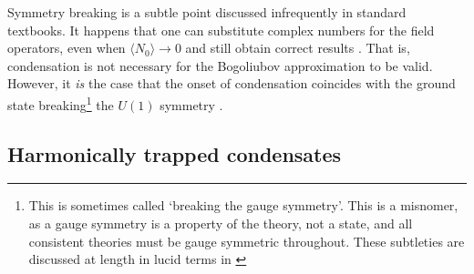 	Symmetry breaking is a subtle point discussed infrequently in standard textbooks. It happens that one can substitute complex numbers for the field operators,  even when $\langle N_0\rangle \rightarrow 0$ and still obtain correct results \cite{ginibre67}. That is, condensation is not necessary for the Bogoliubov approximation to be valid. However, it \emph{is} the case that the onset of condensation coincides with the ground state breaking\footnote{This is sometimes called `breaking the gauge symmetry'. This is a misnomer, as a gauge symmetry is a property of the theory, not a state, and all consistent theories must be gauge symmetric throughout. These subtleties are discussed at length in lucid terms in \cite{poniatowski19}} the $U(1)$ symmetry \cite{suto05} . 


	
	
\subsection*{Harmonically trapped condensates}

